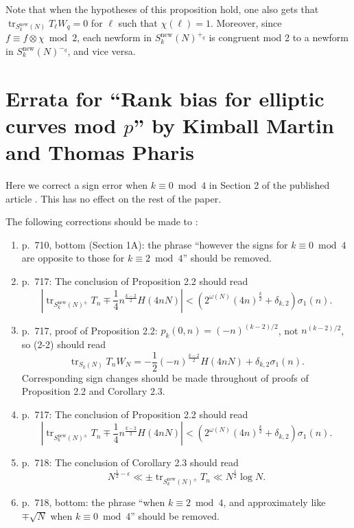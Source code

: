 \documentclass[11pt]{amsart}
\newcommand{\new}{\mathrm{new}}
\renewcommand{\mod}{\bmod}
\DeclareMathOperator{\tr}{tr}
\numberwithin{lem}{section}
\theoremstyle{remark}
\theoremstyle{definition}
\numberwithin{equation}{section}
\begin{document}
Note that when the hypotheses of this proposition hold, one also gets that 
$\tr_{S_k^\new(N)} T_\ell W_q = 0$ for $\ell$ such that $\chi(\ell) = 1$.  Moreover, since $f \equiv f \otimes \chi \mod 2$, each newform in $S_k^\new(N)^{+_q}$ is congruent mod 2 to a newform in $S_k^\new(N)^{-_q}$, and vice versa.


\appendix \section{Errata for ``Rank bias for elliptic curves mod $p$'' by Kimball Martin and Thomas Pharis} \label{appendix}

Here we correct a sign error when $k \equiv 0 \mod 4$ in Section 2 of the published article \cite{me:pharis}.  This has no effect on the rest of the paper.

The following corrections should be made to \cite{me:pharis}:

\begin{enumerate} %
\item p.\ 710, bottom (Section 1A): the phrase ``however the
signs for $k \equiv 0 \mod 4$ are opposite to those for $k \equiv 2 \mod 4$'' should be removed.

\item p.\ 717: The conclusion of Proposition 2.2 should read
\[ \left| \tr_{S_k^\new(N)^\pm} T_n \mp \frac 14 n^{\frac{k-2}2} H(4nN) \right| < 
\left( 2^{\omega(N)} (4n)^{\frac k2} + \delta_{k,2} \right)\sigma_1 (n). \]

\item p.\ 717, proof of Proposition 2.2: $p_k(0,n) = (-n)^{(k-2)/2}$,
not $n^{(k-2)/2}$, so (2-2) should read
\begin{equation} \label{eq:SZ}
 \tr_{S_k(N)} T_n W_N = - \frac 12 (-n)^{\frac{k-2}2} H(4nN) + \delta_{k,2} \sigma_1(n).
 \end{equation}
 Corresponding sign changes should be made throughout of 
 proofs of Proposition 2.2 and Corollary 2.3.

\item p.\ 717: The conclusion of Proposition 2.2 should read
\[ \left| \tr_{S_k^\new(N)^\pm} T_n \mp \frac 14 n^{\frac{k-2}2} H(4nN) \right| < 
\left( 2^{\omega(N)} (4n)^{\frac k2} + \delta_{k,2} \right)\sigma_1(n). \]

\item p.\ 718: The conclusion of Corollary 2.3 should read
\[ N^{\frac 12 - \epsilon} \ll  \pm \tr_{S_k^\new(N)^{\pm}} T_n \ll N^{\frac 12} \log N. \]
 
 \item p.\ 718, bottom: the phrase ``when $k \equiv 2 \mod 4$, and approximately like $\mp \sqrt N$
when $k \equiv 0 \mod 4$'' should be removed.

\end{enumerate}
\end{document}
